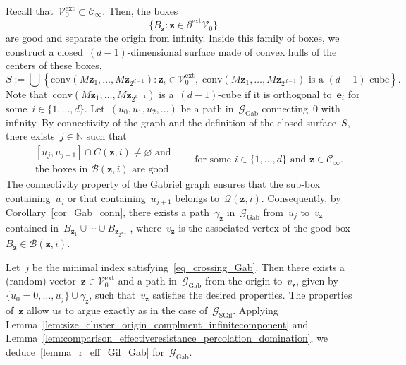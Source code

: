 \documentclass[a4paper,11pt]{article}
\newcommand{\NN}{\mathbb{N}}
\theoremstyle{definition}
\begin{document}
Recall that~$ \mathcal{V}^\mathrm{ext}_0 \subset \mathcal C_\infty$. Then, the boxes 
$$ \{ B_{\mathbf z}: \mathbf z \in \partial^\mathrm{ext} \mathcal V_0 \} $$
are good and separate the origin from infinity. Inside this family of boxes, we construct a closed~$(d-1)$-dimensional surface made of convex hulls of the centers of these boxes,
$$ S := \bigcup \left\{ \mathrm{conv}( M \mathbf z_1,\dots,M \mathbf z_{2^{d-1}} ): \mathbf z_i \in \mathcal V^\mathrm{ext}_0, \; \mathrm{conv}( M \mathbf z_1,\dots,M \mathbf z_{2^{d-1}} ) \text{ is a } (d-1)\text{-cube}  \right\}. $$
Note that~$\mathrm{conv}( M \mathbf z_1,\dots,M \mathbf z_{2^{d-1}} )$ is a~$(d-1)$-cube if it is orthogonal to~$\mathbf e_i$ for some~$i \in \{1,\dots,d\}$. Let~$(u_0,u_1,u_2,\dots)$ be a path in~$\mathcal G_\mathrm{Gab}$ connecting~0 with infinity. By connectivity of the graph and the definition of the closed surface~$S$, there exists~$j \in \NN$ such that
\begin{equation}\label{eq_crossing_Gab}
\begin{array}{ll}
    & [u_j,u_{j+1}] \cap C(\mathbf z,i) \neq \varnothing \text{ and} \\[2mm]
    & \text{the boxes in } \mathcal B(\mathbf z,i) \text{ are good}
\end{array}
\qquad \text{for some } i \in \{1,\dots,d\} \text{ and } \mathbf{z} \in \mathcal C_\infty.
\end{equation}
The connectivity property of the Gabriel graph ensures that the sub-box containing~$u_j$ or that containing~$u_{j+1}$ belongs to~$\mathcal Q(\mathbf z,i)$. Consequently, by Corollary~\ref{cor_Gab_conn}, there exists a path~$\gamma_\mathbf{z}$ in~$\mathcal G_\mathrm{Gab}$ from~$u_j$ to~$v_\mathbf{z}$ contained in~$B_{\mathbf z_1} \cup \cdots \cup B_{\mathbf{z}_{2^{d-1}}}$, where~$v_\mathbf{z}$ is the associated vertex of the good box~$B_\mathbf{z} \in \mathcal B(\mathbf z,i)$. 

Let~$j$ be the minimal index satisfying~\eqref{eq_crossing_Gab}. Then there exists a (random) vector~$\mathbf z \in \mathcal V^\mathrm{ext}_0$ and a path in~$\mathcal G_\mathrm{Gab}$ from the origin to~$v_\mathbf{z}$, given by~$\{u_0=0,\dots,u_j\} \cup \gamma_\mathrm{z}$, such that~$v_\mathbf{z}$ satisfies the desired properties. The properties of~$\mathbf z$ allow us to argue exactly as in the case of~$\mathcal G_\mathrm{SGil}$. Applying Lemma~\ref{lem:size_cluster_origin_complment_infinitecomponent} and Lemma~\ref{lem:comparison_effectiveresistance_percolation_domination}, we deduce~\eqref{lemma_r_eff_Gil_Gab} for~$\mathcal G_\mathrm{Gab}$.
\end{document}
